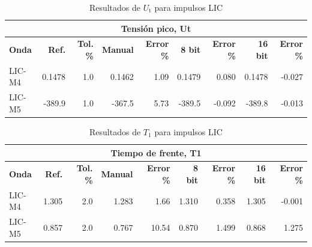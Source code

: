 \begin{table}[H]
    \centering
    \begin{tabular}{@{}lrrrrrrrr@{}}
        \toprule
        \multicolumn{9}{c}{\textbf{Tensión pico, Ut}}                                                                                                                     \\ \midrule
        \textbf{Onda} & \textbf{Ref.} & \textbf{Tol. \%} & \textbf{Manual} & \textbf{Error \%} & \textbf{8 bit} & \textbf{Error \%} & \textbf{16 bit} & \textbf{Error \%} \\ \midrule
        LIC-M4        & 0.1478        & 1.0              & 0.1462          & 1.09              & 0.1479         & 0.080             & 0.1478          & -0.027            \\ \midrule
        LIC-M5        & -389.9        & 1.0              & -367.5          & 5.73              & -389.5         & -0.092            & -389.8          & -0.013            \\ \bottomrule
    \end{tabular}
    \caption{Resultados de $U_\text{t}$ para impulsos LIC}
    \label{tab:resultados_ut_lic}
\end{table}

\begin{table}[H]
    \centering
    \begin{tabular}{@{}lrrrrrrrr@{}}
        \toprule
        \multicolumn{9}{c}{\textbf{Tiempo de frente, T1}}                                                                                                                 \\ \midrule
        \textbf{Onda} & \textbf{Ref.} & \textbf{Tol. \%} & \textbf{Manual} & \textbf{Error \%} & \textbf{8 bit} & \textbf{Error \%} & \textbf{16 bit} & \textbf{Error \%} \\ \midrule
        LIC-M4        & 1.305         & 2.0              & 1.283           & 1.66              & 1.310          & 0.358             & 1.305           & -0.001            \\ \midrule
        LIC-M5        & 0.857         & 2.0              & 0.767           & 10.54             & 0.870          & 1.499             & 0.868           & 1.275             \\ \bottomrule
    \end{tabular}
    \caption{Resultados de $T_1$ para impulsos LIC}
    \label{tab:resultados_t1_lic}
\end{table}

